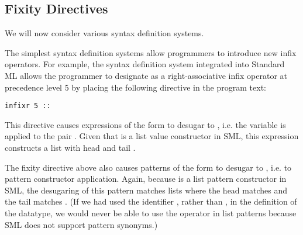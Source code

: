 
\subsection{Fixity Directives}\label{sec:Fixity-directives}
We will now consider various syntax definition systems.

The simplest syntax definition systems allow programmers to introduce new infix operators. For example, the syntax definition system integrated into Standard ML allows the programmer to designate \li{::} as a right-associative infix operator at precedence level 5 by placing the following directive in the program text:
\begin{lstlisting}[numbers=none]
infixr 5 ::
\end{lstlisting}
This directive causes expressions of the form  to desugar to , i.e. the variable  is applied to the pair . Given that  is a list value constructor in SML, this expression constructs a list with head  and tail .

The fixity directive above also causes patterns of the form  to desugar to , i.e. to pattern constructor application. Again, because  is a list pattern constructor in SML, the desugaring of this pattern matches lists where the head matches  and the tail matches . (If we had used the identifier , rather than , in the definition of the  datatype, we would never be able to use the \li{::} operator in list patterns because SML does not support pattern synonyms.)%

